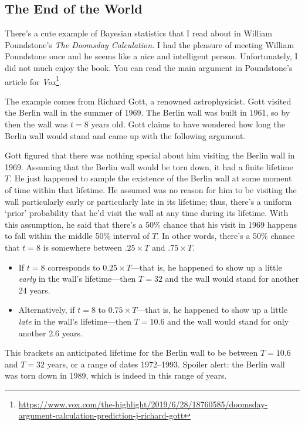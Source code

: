 \subsection{The End of the World}

There's a cute example of Bayesian statistics that I read about in William Poundstone's \emph{The Doomsday Calculation.} I had the pleasure of meeting William Poundstone once and he seems like a nice and intelligent person. Unfortunately, I did not much enjoy the book. You can read the main argument in Poundstone's article for \emph{Vox}\footnote{\url{https://www.vox.com/the-highlight/2019/6/28/18760585/doomsday-argument-calculation-prediction-j-richard-gott}}.

The example comes from Richard Gott, a renowned astrophysicist. Gott visited the Berlin wall in the summer of 1969. The Berlin wall was built in 1961, so by then the wall was $t=8$ years old. Gott claims to have wondered how long the Berlin wall would stand and came up with the following argument.

Gott figured that there was nothing special about him visiting the Berlin wall in 1969. Assuming that the Berlin wall would be torn down, it had a finite lifetime $T$. He just happened to sample the existence of the Berlin wall at some moment of time within that lifetime. He assumed was no reason for him to be visiting the wall particularly early or particularly late in its lifetime; thus, there's a uniform `prior' probability that he'd visit the wall at any time during its lifetime. With this assumption, he said that there's a 50\% chance that his visit in 1969 happens to fall within the middle 50\% interval of $T$. In other words, there's a 50\% chance that $t=8$ is somewhere between $.25\times T$ and $.75\times T$. 
\begin{itemize}
\item If $t=8$ corresponds to $0.25 \times T$---that is, he happened to show up a little \emph{early} in the wall's lifetime---then $T=32$ and the wall would stand for another 24 years. 

\item Alternatively, if $t=8$ to $0.75 \times T$---that is, he happened to show up a little \emph{late} in the wall's lifetime---then $T=10.6$ and the wall would stand for only another 2.6 years. 
\end{itemize}
This brackets an anticipated lifetime for the Berlin wall to be between $T=10.6$ and $T=32$ years, or a range of dates 1972--1993. Spoiler alert: the Berlin wall was torn down in 1989, which is indeed in this range of years. 

